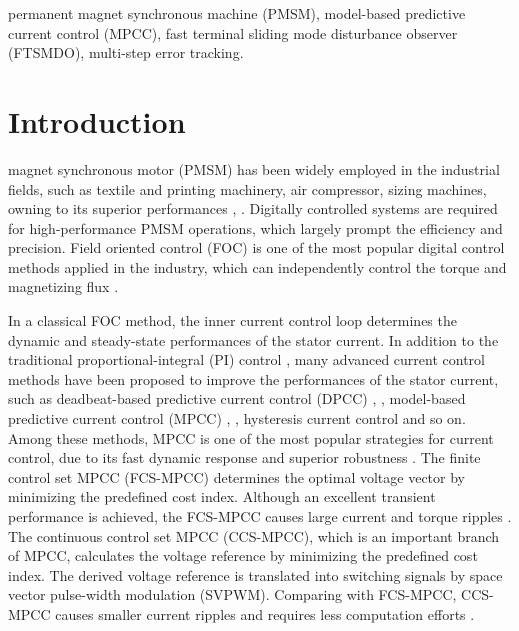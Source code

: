 \documentclass[a4paper, 8pt, twocolumn]{IEEEtran}
\begin{document}
\begin{IEEEkeywords}
permanent magnet synchronous machine (PMSM), model-based predictive current control (MPCC), fast terminal sliding mode disturbance observer (FTSMDO), multi-step error tracking.
\end{IEEEkeywords}

{}


\section{Introduction}

 magnet synchronous motor (PMSM) has been widely employed in the industrial fields, such as textile and printing machinery, air compressor, sizing machines, owning to its superior performances \cite{7496947}, \cite{8411491}. Digitally controlled systems are required for high-performance PMSM operations, which largely prompt the efficiency and precision. Field oriented control (FOC) is one of the most popular digital control methods applied in the industry, which can independently control the torque and magnetizing flux \cite{7997817}.\par
In a classical FOC method, the inner current control loop determines the dynamic and steady-state performances of the stator current. In addition to the traditional proportional-integral (PI) control \cite{5514961}, many advanced current control methods have been proposed to improve the performances of the stator current, such as deadbeat-based predictive current control (DPCC) \cite{7460909}, \cite{7898852}, model-based predictive current control (MPCC) \cite{7926330}, \cite{7086309}, hysteresis current control \cite{954560} and so on. Among these methods, MPCC is one of the most popular strategies for current control, due to its fast dynamic response and superior robustness \cite{8409352}. The finite control set MPCC (FCS-MPCC) determines the optimal voltage vector by minimizing the predefined cost index. Although an excellent transient performance is achieved, the FCS-MPCC causes large current and torque ripples \cite{8054721}. The continuous control set MPCC (CCS-MPCC), which is an important branch of MPCC, calculates the voltage reference by minimizing the predefined cost index. The derived voltage reference is translated into switching signals by space vector pulse-width modulation (SVPWM). Comparing with FCS-MPCC, CCS-MPCC causes smaller current ripples and requires less computation efforts \cite{8054721}.\par
\end{document}

